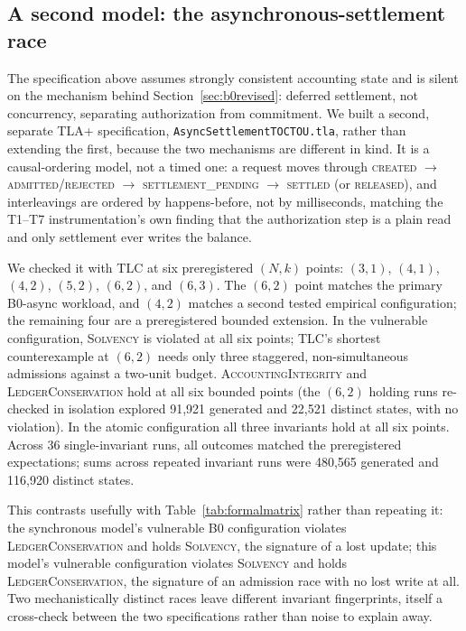 \documentclass[manuscript,review,anonymous]{acmart}
\begin{document}
\subsection{A second model: the asynchronous-settlement race}
\label{sec:asyncformal}
The specification above assumes strongly consistent accounting state and is silent on
the mechanism behind Section~\ref{sec:b0revised}: deferred settlement, not concurrency,
separating authorization from commitment. We built a second, separate TLA+
specification, \texttt{AsyncSettlementTOCTOU.tla}, rather than extending the first,
because the two mechanisms are different in kind. It is a causal-ordering model, not a
timed one: a request moves through \textsc{created}
$\to$ \textsc{admitted}/\textsc{rejected} $\to$ \textsc{settlement\_pending} $\to$
\textsc{settled} (or \textsc{released}), and interleavings are ordered by happens-before,
not by milliseconds, matching the T1--T7 instrumentation's own finding that the
authorization step is a plain read and only settlement ever writes the balance.

We checked it with TLC at six preregistered $(N,k)$ points: $(3,1)$, $(4,1)$, $(4,2)$,
$(5,2)$, $(6,2)$, and $(6,3)$. The $(6,2)$ point matches the primary B0-async workload,
and $(4,2)$ matches a second tested empirical configuration; the remaining four are a
preregistered bounded extension. In the vulnerable configuration, \textsc{Solvency} is
violated at all six points; TLC's shortest
counterexample at $(6,2)$ needs only three staggered, non-simultaneous admissions against
a two-unit budget. \textsc{AccountingIntegrity} and \textsc{LedgerConservation} hold at
all six bounded points (the $(6,2)$ holding runs re-checked in isolation explored 91{,}921
generated and 22{,}521 distinct states, with no violation). In the atomic configuration
all three invariants hold at all six points. Across 36 single-invariant runs, all outcomes
matched the preregistered expectations; sums across repeated invariant runs were 480{,}565
generated and 116{,}920 distinct states.

This contrasts usefully with Table~\ref{tab:formalmatrix} rather than repeating it: the
synchronous model's vulnerable B0 configuration violates \textsc{LedgerConservation} and
holds \textsc{Solvency}, the signature of a lost update; this model's vulnerable
configuration violates \textsc{Solvency} and holds \textsc{LedgerConservation}, the
signature of an admission race with no lost write at all. Two mechanistically distinct
races leave different invariant fingerprints, itself a cross-check between the two
specifications rather than noise to explain away.
\end{document}
